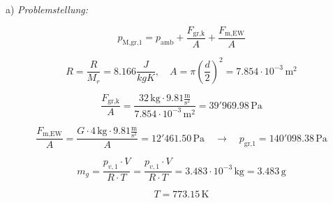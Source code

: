 a) \textit{Problemstellung:} 

\[
p_{\text{M,gr,1}} = p_{\text{amb}} + \frac{F_{\text{gr,k}}}{A} + \frac{F_{\text{m,EW}}}{A}
\]

\[
R = \frac{R}{M_r} = 8.166 \frac{J}{kgK}, \quad A = \pi \left( \frac{d}{2} \right)^2 = 7.854 \cdot 10^{-3} \, \text{m}^2
\]

\[
\frac{F_{\text{gr,k}}}{A} = \frac{32 \, \text{kg} \cdot 9.81 \frac{\text{m}}{\text{s}^2}}{7.854 \cdot 10^{-3} \, \text{m}^2} = 39'969.98 \, \text{Pa}
\]

\[
\frac{F_{\text{m,EW}}}{A} = \frac{G \cdot 4 \, \text{kg} \cdot 9.81 \frac{\text{m}}{\text{s}^2}}{A} = 12'461.50 \, \text{Pa} \quad \rightarrow \quad p_{\text{gr,1}} = 140'098.38 \, \text{Pa}
\]

\[
m_{g} = \frac{p_{v,1} \cdot V}{R \cdot T} = \frac{p_{v,1} \cdot V}{R \cdot T} = 3.483 \cdot 10^{-3} \, \text{kg} = 3.483 \, \text{g}
\]

\[
T = 773.15 \, \text{K}
\]